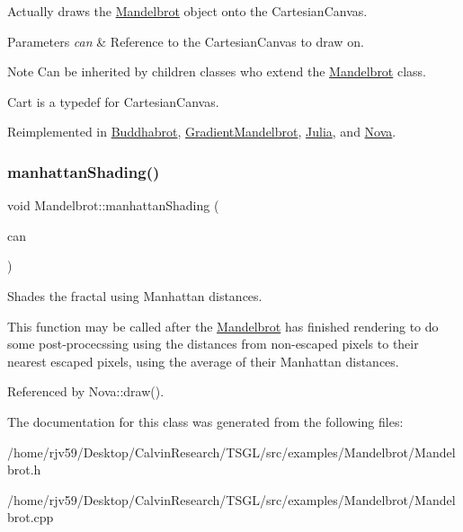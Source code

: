 Actually draws the \hyperlink{class_mandelbrot}{Mandelbrot} object onto the Cartesian\+Canvas. 
\begin{DoxyParams}{Parameters}
{\em can} & Reference to the Cartesian\+Canvas to draw on. \\
\hline
\end{DoxyParams}
\begin{DoxyNote}{Note}
Can be inherited by children classes who extend the \hyperlink{class_mandelbrot}{Mandelbrot} class. 

Cart is a typedef for Cartesian\+Canvas. 
\end{DoxyNote}


Reimplemented in \hyperlink{class_buddhabrot_a9e65eb7e2cac8737aedec56a7e2c274c}{Buddhabrot}, \hyperlink{class_gradient_mandelbrot_a1d4aa3e44d7d1c2241545b60c79985df}{Gradient\+Mandelbrot}, \hyperlink{class_julia_ab877233424159ca87da6dcf0f0f36e51}{Julia}, and \hyperlink{class_nova_a66935ba0814dfabcae2481c128c336ec}{Nova}.

\mbox{\label{class_mandelbrot_aef094f9bb9b2fd1107481b150205ff53}} 
\subsubsection{\texorpdfstring{manhattan\+Shading()}{manhattanShading()}}
{\footnotesize\ttfamily void Mandelbrot\+::manhattan\+Shading (\begin{DoxyParamCaption}\item[{\hyperlink{classtsgl_1_1_cartesian_canvas}{Cartesian\+Canvas} \&}]{can }\end{DoxyParamCaption})\hspace{0.3cm}{\ttfamily [protected]}}



Shades the fractal using Manhattan distances. 

This function may be called after the \hyperlink{class_mandelbrot}{Mandelbrot} has finished rendering to do some post-\/procecssing using the distances from non-\/escaped pixels to their nearest escaped pixels, using the average of their Manhattan distances. 

Referenced by Nova\+::draw().



The documentation for this class was generated from the following files\+:\begin{DoxyCompactItemize}
\item 
/home/rjv59/\+Desktop/\+Calvin\+Research/\+T\+S\+G\+L/src/examples/\+Mandelbrot/Mandelbrot.\+h\item 
/home/rjv59/\+Desktop/\+Calvin\+Research/\+T\+S\+G\+L/src/examples/\+Mandelbrot/Mandelbrot.\+cpp\end{DoxyCompactItemize}
